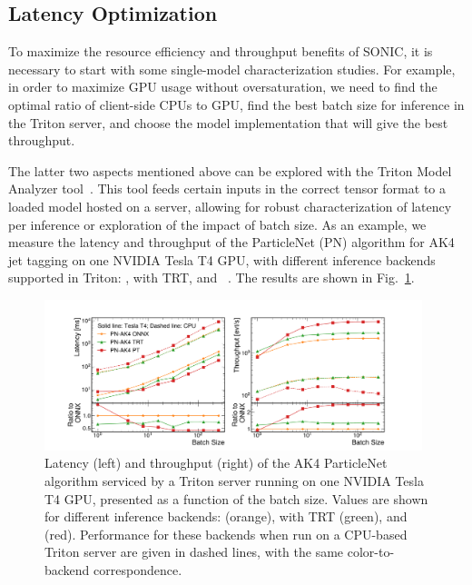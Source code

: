 \subsection{Latency Optimization}
\label{sec:algo_acceleration}


To maximize the resource efficiency and throughput benefits of SONIC, it is necessary to start with some single-model characterization studies. For example, in order to maximize GPU usage without oversaturation, we need to find the optimal ratio of client-side CPUs to GPU, find the best batch size for inference in the Triton server, and choose the model implementation that will give the best throughput.

The latter two aspects mentioned above can be explored with the Triton Model Analyzer tool~\cite{triton_model_analyzer}. This tool feeds certain inputs in the correct tensor format to a loaded model hosted on a server, allowing for robust characterization of latency per inference or exploration of the impact of batch size.
As an example, we measure the latency and throughput of the ParticleNet (PN) algorithm for AK4 jet tagging on one NVIDIA Tesla T4 GPU, with different inference backends supported in Triton: \ONNX, \ONNX with TRT, and \PYTORCH~\cite{pytorch}. %
The results are shown in Fig.~\ref{fig:throughputs_pn}. 

\begin{figure}[ht]
    \centering
    \includegraphics[width=0.98\textwidth]{plots/latencies_throughputs_pn.pdf}
    \caption{Latency (left) and throughput (right) of the AK4 ParticleNet algorithm serviced by a Triton server running on one NVIDIA Tesla T4 GPU, presented as a function of the batch size. Values are shown for different inference backends: \ONNX (orange), \ONNX with TRT (green), and \PYTORCH (red). Performance for these backends when run on a CPU-based Triton server are given in dashed lines, with the same color-to-backend correspondence.}%
    \label{fig:throughputs_pn}
\end{figure}

